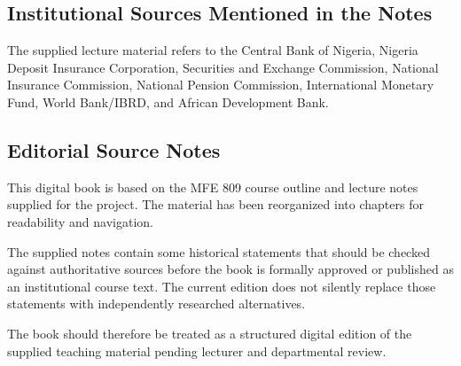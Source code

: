 \documentclass[
]{article}
\begin{document}
\subsection{Institutional Sources Mentioned in the Notes}\label{institutional-sources-mentioned-in-the-notes}

The supplied lecture material refers to the Central Bank of Nigeria, Nigeria Deposit Insurance Corporation, Securities and Exchange Commission, National Insurance Commission, National Pension Commission, International Monetary Fund, World Bank/IBRD, and African Development Bank.

\subsection{Editorial Source Notes}\label{editorial-source-notes}

This digital book is based on the MFE 809 course outline and lecture notes supplied for the project. The material has been reorganized into chapters for readability and navigation.

The supplied notes contain some historical statements that should be checked against authoritative sources before the book is formally approved or published as an institutional course text. The current edition does not silently replace those statements with independently researched alternatives.

The book should therefore be treated as a structured digital edition of the supplied teaching material pending lecturer and departmental review.
\end{document}

